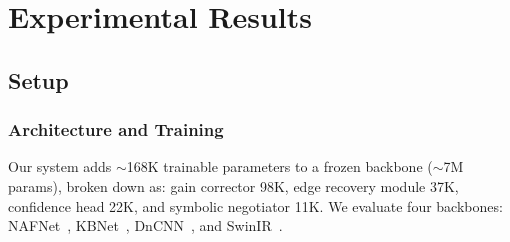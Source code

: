 \documentclass{ieeetj}
\begin{document}
\section{Experimental Results}
\label{sec:experiments}

\subsection{Setup}
\label{sec:setup}

\subsubsection{Architecture and Training}
Our system adds ${\sim}$168K trainable parameters to a frozen backbone (${\sim}$7M params), broken down as: gain corrector 98K, edge recovery module 37K, confidence head 22K, and symbolic negotiator 11K. We evaluate four backbones: NAFNet~\cite{chen2022simple}, KBNet~\cite{zhang2023kbnet}, DnCNN~\cite{zhang2017beyond}, and SwinIR~\cite{liang2021swinir}.
\end{document}
